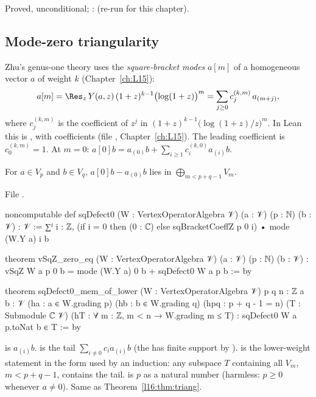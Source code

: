 \begin{status}
Proved, unconditional; \allowbreak{}\allowbreak{}: \lean{[propext, Classical.}\allowbreak{}\allowbreak\lean{sound]}
(re-run for this chapter).
\end{status}

\subsection{Mode-zero triangularity}

Zhu's genus-one theory uses the \emph{square-bracket modes} $a[m]$ of a homogeneous vector $a$ of weight
$k$ (Chapter~\ref{ch:L15}):
\begin{equation*}
a[m] = \Res_z\,Y(a,z)\,(1+z)^{k-1}\bigl(\log(1+z)\bigr)^m = \sum_{j\ge0}c^{(k,m)}_j\,a_{(m+j)} ,
\end{equation*}
where $c^{(k,m)}_j$ is the coefficient of $z^j$ in $(1+z)^{k-1}\bigl(\log(1+z)/z\bigr)^m$. In Lean this is
, with coefficients  (file
, Chapter~\ref{ch:L15}).
The leading coefficient is $c^{(k,m)}_0 = 1$. At $m=0$:
$a[0]b = a_{(0)}b + \sum_{i\ge1}c^{(k,0)}_i a_{(i)}b$.

\begin{theorem}\label{l16:thm:triang}
For $a\in V_p$ and $b\in V_q$, $a[0]b - a_{(0)}b$ lies in $\bigoplus_{m<p+q-1}V_m$.
\end{theorem}
\noindent File .
\begin{leancode}
noncomputable def sqDefect0 (W : VertexOperatorAlgebra 𝒱) (a : 𝒱) (p : ℕ) (b : 𝒱) : 𝒱 :=
  ∑ᶠ i : ℤ, (if i = 0 then (0 : ℂ) else sqBracketCoeffZ p 0 i) • mode (W.Y a) i b

theorem vSqZ_zero_eq (W : VertexOperatorAlgebra 𝒱) (a : 𝒱) (p : ℕ) (b : 𝒱) :
    vSqZ W a p 0 b = mode (W.Y a) 0 b + sqDefect0 W a p b := by

theorem sqDefect0_mem_of_lower (W : VertexOperatorAlgebra 𝒱) {p q n : ℤ} {a b : 𝒱}
    (ha : a ∈ W.grading p) (hb : b ∈ W.grading q)
    (hpq : p + q - 1 = n) (T : Submodule ℂ 𝒱)
    (hT : ∀ m : ℤ, m < n → W.grading m ≤ T) :
    sqDefect0 W a p.toNat b ∈ T := by
\end{leancode}

\begin{dictionary}
 is $a_{(i)}b$.  is the tail $\sum_{i\ne0}c_i a_{(i)}b$ (the  has
finite support by \allowbreak{}\allowbreak{}).  is the lower-weight statement in
the form used by an induction: any subspace $T$ containing all $V_m$, $m<p+q-1$, contains the tail.  is
$p$ as a natural number (harmless: $p\ge0$ whenever $a\ne0$). Same as Theorem~\ref{l16:thm:triang}.
\end{dictionary}

